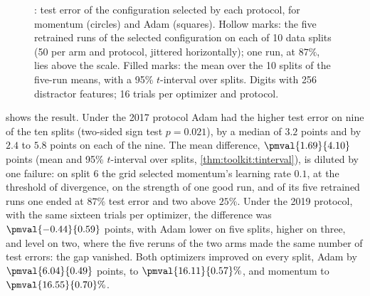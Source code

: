 \begin{refsection}
\begin{figure}[t]
\centering
{}
\caption{: test error of the configuration selected by each protocol, for momentum (circles) and Adam (squares). Hollow marks: the five retrained runs of the selected configuration on each of 10 data splits (50 per arm and protocol, jittered horizontally); one run, at $87\%$, lies above the scale. Filled marks: the mean over the 10 splits of the five-run means, with a 95\% $t$-interval over splits. Digits with 256 distractor features; 16 trials per optimizer and protocol.}
\label{fig:budgets:protocols}
\end{figure}

 shows the result. Under the 2017 protocol Adam had the higher test error on nine of the ten splits (two-sided sign test $p=0.021$), by a median of $3.2$ points and by $2.4$ to $5.8$ points on each of the nine. The mean difference, $\pmval{1.69}{4.10}$ points (mean and 95\% $t$-interval over splits, \cref{thm:toolkit:tinterval}), is diluted by one failure: on split 6 the grid selected momentum's learning rate $0.1$, at the threshold of divergence, on the strength of one good run, and of its five retrained runs one ended at $87\%$ test error and two above $25\%$. Under the 2019 protocol, with the same sixteen trials per optimizer, the difference was $\pmval{-0.44}{0.59}$ points, with Adam lower on five splits, higher on three, and level on two, where the five reruns of the two arms made the same number of test errors: the gap vanished. Both optimizers improved on every split, Adam by $\pmval{6.04}{0.49}$ points, to $\pmval{16.11}{0.57}\%$, and momentum to $\pmval{16.55}{0.70}\%$.


\end{refsection}

